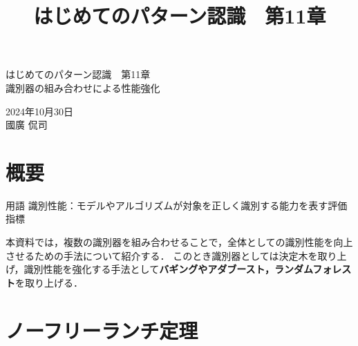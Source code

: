 \documentclass[dvipdfmx]{jreport}
\title{はじめてのパターン認識　第11章}
\begin{document}
\begin{center}{
        \large{はじめてのパターン認識　第11章}\\
        \Large{識別器の組み合わせによる性能強化}
}
\end{center}

\begin{flushright}
    2024年10月30日\\
    國廣 侃司
\end{flushright}



\section{概要}
\begin{itembox}[l]{\large{用語}}
        \hspace{15pt} \raisebox{0.5ex}{\tiny $\bullet$} 識別性能：モデルやアルゴリズムが対象を正しく識別する能力を表す評価指標
\end{itembox}

本資料では，複数の識別器を組み合わせることで，全体としての識別性能を向上させるための手法について紹介する．
このとき識別器としては決定木を取り上げ，識別性能を強化する手法として\textbf{バギングやアダブースト，ランダムフォレスト}を取り上げる．

\section{ノーフリーランチ定理}
\end{document}
